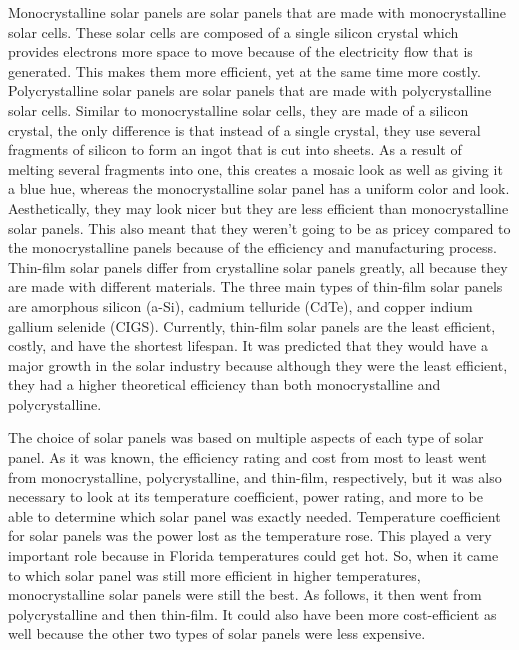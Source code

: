 Monocrystalline solar panels are solar panels that are made with monocrystalline solar cells. These solar cells are composed of a single silicon crystal which provides electrons more space to move because of the electricity flow that is generated. This makes them more efficient, yet at the same time more costly. Polycrystalline solar panels are solar panels that are made with polycrystalline solar cells. Similar to monocrystalline solar cells, they are made of a silicon crystal, the only difference is that instead of a single crystal, they use several fragments of silicon to form an ingot that is cut into sheets. As a result of melting several fragments into one, this creates a mosaic look as well as giving it a blue hue, whereas the monocrystalline solar panel has a uniform color and look. Aesthetically, they may look nicer but they are less efficient than monocrystalline solar panels. This also meant that they weren’t going to be as pricey compared to the monocrystalline panels because of the efficiency and manufacturing process. Thin-film solar panels differ from crystalline solar panels greatly, all because they are made with different materials. The three main types of thin-film solar panels are amorphous silicon (a-Si), cadmium telluride (CdTe), and copper indium gallium selenide (CIGS). Currently, thin-film solar panels are the least efficient, costly, and have the shortest lifespan. It was predicted that they would have a major growth in the solar industry because although they were the least efficient, they had a higher theoretical efficiency than both monocrystalline and polycrystalline.

The choice of solar panels was based on multiple aspects of each type of solar panel. As it was known, the efficiency rating and cost from most to least went from monocrystalline, polycrystalline, and thin-film, respectively, but it was also necessary to look at its temperature coefficient, power rating, and more to be able to determine which solar panel was exactly needed. Temperature coefficient for solar panels was the power lost as the temperature rose. This played a very important role because in Florida temperatures could get hot. So, when it came to which solar panel was still more efficient in higher temperatures, monocrystalline solar panels were still the best. As follows, it then went from polycrystalline and then thin-film. It could also have been more cost-efficient as well because the other two types of solar panels were less expensive.

